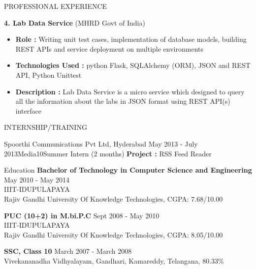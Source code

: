 \documentclass{resume} %
\begin{document}
\begin{rSection}{PROFESSIONAL EXPERIENCE}
\begin{rSubsection}
\bigskip

\textbf {4. Lab Data Service} (MHRD Govt of India)
\begin{itemize}
\item \textbf{Role : } Writing
unit test cases, implementation of database models, building REST APIs
and service deployment on multiple environments \item \textbf{Technologies Used :} python Flask, SQLAlchemy (ORM),
JSON and REST API, Python Unittest \item \textbf{Description :} Lab Data
Service is a micro service which designed to query all the information
about the labs in JSON format using REST API(s) interface
\end{itemize}


    
  \end{rSubsection}

\end{rSection}


\begin{rSection}{INTERNSHIP/TRAINING}
  \begin{rSubsection}
  {Spoorthi Communications Pvt Ltd, Hyderabad} {May 2013 - July
    2013}{Media10}{Summer Intern (2 months)}
  \textbf{Project :} RSS Feed Reader
  \end{rSubsection} 

\end{rSection} 



\begin{rSection}{Education}
  {\bf Bachelor of Technology in Computer Science and Engineering} \hfill {May 2010 - May 2014}
  \\ 
  IIIT-IDUPULAPAYA
  \\
  Rajiv Gandhi University Of Knowledge Technologies,  CGPA: 7.68/10.00  
  
  {\bf PUC (10+2) in M.bi.P.C} \hfill {Sept 2008 - May 2010}
  \\
  IIIT-IDUPULAPAYA
  \\
  Rajiv Gandhi University Of Knowledge Technologies,  CGPA: 8.05/10.00  
  
  {\textbf{SSC, Class 10}}  \hfill March 2007 - March  2008 \\
  Vivekananadha Vidhyalayam, Gandhari, Kamareddy, Telangana, 80.33\% 

\end{rSection}
\end{document}
